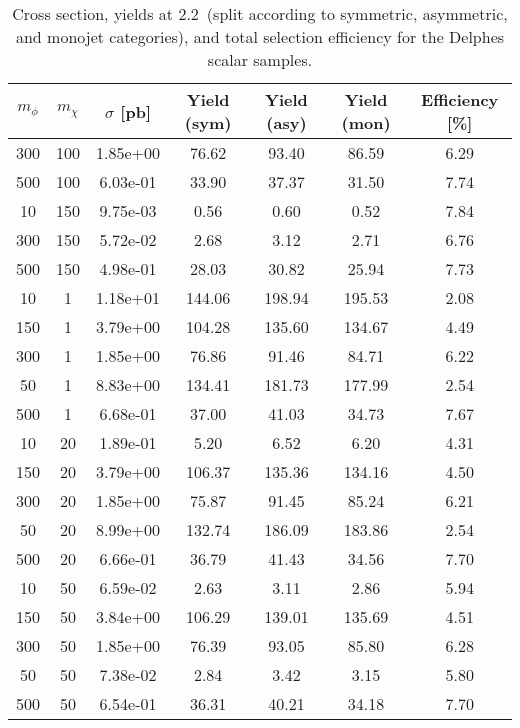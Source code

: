 \begin{table}
\footnotesize
\centering
\begin{tabular}{ccccccc}
\hline\hline
$m_\phi$ & $m_\chi$ & $\sigma$ [pb] & Yield (sym) & Yield (asy) & Yield (mon) & Efficiency [\%] \\ \hline
300       &   100       &   1.85e+00  &   76.62     &   93.40     &   86.59     &   6.29      \\ 
500       &   100       &   6.03e-01  &   33.90     &   37.37     &   31.50     &   7.74      \\ 
10        &   150       &   9.75e-03  &   0.56      &   0.60      &   0.52      &   7.84      \\ 
300       &   150       &   5.72e-02  &   2.68      &   3.12      &   2.71      &   6.76      \\ 
500       &   150       &   4.98e-01  &   28.03     &   30.82     &   25.94     &   7.73      \\ 
10        &   1         &   1.18e+01  &   144.06    &   198.94    &   195.53    &   2.08      \\ 
150       &   1         &   3.79e+00  &   104.28    &   135.60    &   134.67    &   4.49      \\ 
300       &   1         &   1.85e+00  &   76.86     &   91.46     &   84.71     &   6.22      \\ 
50        &   1         &   8.83e+00  &   134.41    &   181.73    &   177.99    &   2.54      \\ 
500       &   1         &   6.68e-01  &   37.00     &   41.03     &   34.73     &   7.67      \\ 
10        &   20        &   1.89e-01  &   5.20      &   6.52      &   6.20      &   4.31      \\ 
150       &   20        &   3.79e+00  &   106.37    &   135.36    &   134.16    &   4.50      \\ 
300       &   20        &   1.85e+00  &   75.87     &   91.45     &   85.24     &   6.21      \\ 
50        &   20        &   8.99e+00  &   132.74    &   186.09    &   183.86    &   2.54      \\ 
500       &   20        &   6.66e-01  &   36.79     &   41.43     &   34.56     &   7.70      \\ 
10        &   50        &   6.59e-02  &   2.63      &   3.11      &   2.86      &   5.94      \\ 
150       &   50        &   3.84e+00  &   106.29    &   139.01    &   135.69    &   4.51      \\ 
300       &   50        &   1.85e+00  &   76.39     &   93.05     &   85.80     &   6.28      \\ 
50        &   50        &   7.38e-02  &   2.84      &   3.42      &   3.15      &   5.80      \\ 
500       &   50        &   6.54e-01  &   36.31     &   40.21     &   34.18     &   7.70      \\ 
\hline\hline
\end{tabular}
\caption{Cross section, yields at 2.2~\ifb (split according to symmetric, asymmetric, and monojet categories), and total selection efficiency for the Delphes scalar samples.}
\label{tab:summmary_ScorpionDMS}
\end{table}

